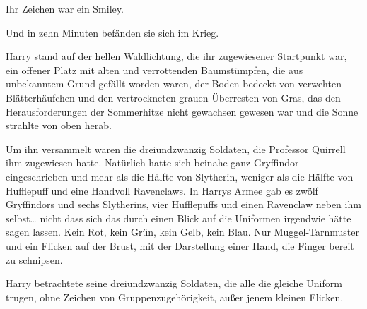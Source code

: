 Ihr Zeichen war ein Smiley.

Und in zehn Minuten befänden sie sich im Krieg.

Harry stand auf der hellen Waldlichtung, die ihr zugewiesener Startpunkt war, ein offener Platz mit alten und verrottenden Baumstümpfen, die aus unbekanntem Grund gefällt worden waren, der Boden bedeckt von verwehten Blätterhäufchen und den vertrockneten grauen Überresten von Gras, das den Herausforderungen der Sommerhitze nicht gewachsen gewesen war und die Sonne strahlte von oben herab.

Um ihn versammelt waren die dreiundzwanzig Soldaten, die Professor Quirrell ihm zugewiesen hatte. Natürlich hatte sich beinahe ganz Gryffindor eingeschrieben und mehr als die Hälfte von Slytherin, weniger als die Hälfte von Hufflepuff und eine Handvoll Ravenclaws. In Harrys Armee gab es zwölf Gryffindors und sechs Slytherins, vier Hufflepuffs und einen Ravenclaw neben ihm selbst… nicht dass sich das durch einen Blick auf die Uniformen irgendwie hätte sagen lassen. Kein Rot, kein Grün, kein Gelb, kein Blau. Nur Muggel-Tarnmuster und ein Flicken auf der Brust, mit der Darstellung einer Hand, die Finger bereit zu schnipsen.

Harry betrachtete seine dreiundzwanzig Soldaten, die alle die gleiche Uniform trugen, ohne Zeichen von Gruppenzugehörigkeit, außer jenem kleinen Flicken.

